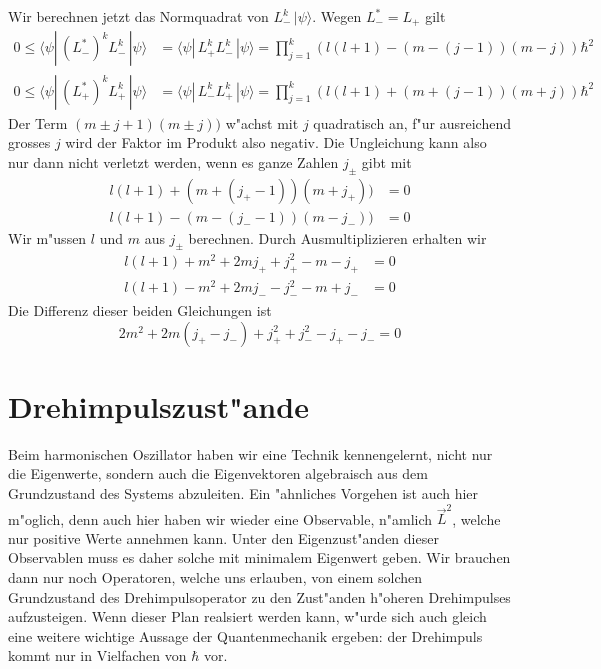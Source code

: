 Wir berechnen jetzt das Normquadrat von $L_-^k\,|\psi\rangle$. Wegen
$L_-^*=L_+$ gilt
\begin{align*}
0
\le
\langle\psi|\, (L_-^*)^kL_-^k\,|\psi\rangle
&=
\langle\psi|\, L_+^kL_-^k\,|\psi\rangle
=
\prod_{j=1}^k(l(l+1)-(m-(j-1))(m-j))\hbar^2
\\
0
\le
\langle\psi|\, (L_+^*)^kL_+^k\,|\psi\rangle
&=
\langle\psi|\, L_-^kL_+^k\,|\psi\rangle
=
\prod_{j=1}^k(l(l+1)+(m+(j-1))(m+j))\hbar^2
\end{align*}
Der Term $(m\pm j+1)(m\pm j))$ w"achst mit $j$ quadratisch an, 
f"ur ausreichend grosses $j$ wird der Faktor im Produkt also negativ.
Die Ungleichung kann also nur dann nicht verletzt werden, wenn 
es ganze Zahlen $j_\pm$ gibt mit
\begin{align*}
l(l+1)+(m+(j_+-1))(m+j_+))&=0
\\
l(l+1)-(m-(j_--1))(m-j_-))&=0
\end{align*}
Wir m"ussen $l$ und $m$ aus $j_\pm$ berechnen.
Durch Ausmultiplizieren erhalten wir
\begin{align*}
l(l+1)+
m^2+2mj_++j_+^2-m-j_+
&=0
\\
l(l+1)
-
m^2+2mj_--j_-^2-m+j_-
&=0
\end{align*}
Die Differenz dieser beiden Gleichungen ist
\[
2m^2+2m(j_+-j_-)+j_+^2+j_-^2-j_+-j_-=0
\]

\section{Drehimpulszust"ande\label{section:drehimpulszustaende}}
Beim harmonischen Oszillator haben wir eine Technik kennengelernt, nicht
nur die Eigenwerte, sondern auch die Eigenvektoren algebraisch aus dem
Grundzustand des Systems abzuleiten.
Ein "ahnliches Vorgehen ist auch hier m"oglich, denn auch hier haben wir
wieder eine Observable, n"amlich $\vec L^2$, welche nur positive
Werte annehmen kann.
Unter den Eigenzust"anden dieser Observablen muss es daher solche mit
minimalem Eigenwert geben.
Wir brauchen dann nur noch Operatoren, welche uns erlauben, von einem
solchen Grundzustand des Drehimpulsoperator zu den Zust"anden 
h"oheren Drehimpulses aufzusteigen.
Wenn dieser Plan realsiert werden kann, w"urde sich auch gleich
eine weitere wichtige Aussage der Quantenmechanik ergeben: der Drehimpuls
kommt nur in Vielfachen von $\hbar$ vor.

